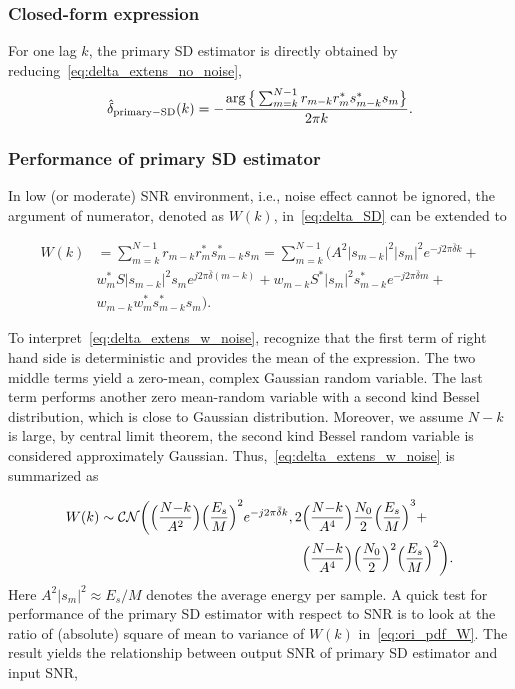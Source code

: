 \subsubsection{Closed-form expression} 
For one lag $k$, the primary SD estimator is directly obtained by reducing~\eqref{eq:delta_extens_no_noise},
\begin{equation}
    \label{eq:delta_SD}
    \hat{\delta}_{\text{primary}-\text{SD}}(k)=-\frac{\arg\big\{\sum_{m=k}^{N-1}r_{m-k}r_m^*s_{m-k}^*s_m\big\}}{2\pi k}.
\end{equation}

\subsubsection{Performance of primary SD estimator}
In low (or moderate) SNR environment, i.e., noise effect cannot be ignored, the argument of numerator, denoted as $W(k)$, in~\eqref{eq:delta_SD} can be extended to 

\begin{equation}
  \label{eq:delta_extens_w_noise}
  \begin{aligned}
    W(k)&=\sum_{m=k}^{N-1}r_{m-k}r_m^*s_{m-k}^*s_m= \sum_{m=k}^{N-1} \Big( A^2|s_{m-k}|^2|s_m|^2e^{-j2\pi \bar{\delta} k} + \\
    &w_m^* S|s_{m-k}|^2s_m e^{j2\pi \bar{\delta}(m-k)} + w_{m-k}S^*|s_m|^2s_{m-k}^* e^{-j2\pi \bar{\delta} m} + \\
    &w_{m-k}w_m^*s_{m-k}^*s_m \Big) .
  \end{aligned}
\end{equation}

To interpret~\eqref{eq:delta_extens_w_noise}, recognize that the first term of right hand side is
deterministic and provides the mean of the expression. The two middle terms yield a zero-mean, complex Gaussian random variable. 
The last term performs another zero mean-random variable with a second kind Bessel distribution, which is close to Gaussian distribution. Moreover, we assume
$N{-}k$ is large, by central limit theorem, the second kind Bessel random variable is considered approximately Gaussian.      
Thus,~\eqref{eq:delta_extens_w_noise} is summarized as

\begin{equation}
  \begin{aligned}
    \label{eq:ori_pdf_W}
    W(k) \sim \mathcal{CN}\bigg(\Big(
    \frac{N{-}k}{A^2}\Big){\Big(\frac{E_s}{M}\Big)}^2e^{-j2\pi \bar{\delta} k},
    2&\Big(\frac{N{-}k}{A^4}\Big)\frac{N_0}{2}{\Big(\frac{E_s}{M}\Big)}^3+ \\
    &\Big(\frac{N{-}k}{A^4}\Big)\Big(\frac{N_0}{2}\Big)^2{\Big(\frac{E_s}{M}\Big)}^2\bigg).
  \end{aligned}
\end{equation}
Here $A^2|s_m|^2 {\approx} E_s/M$ denotes the average energy per
sample. A quick test for performance of the primary SD estimator with respect to SNR is to look at the ratio of 
(absolute) square of mean to variance of $W(k)$ in~\eqref{eq:ori_pdf_W}. The result yields the relationship between
output SNR of primary SD estimator and input SNR,

